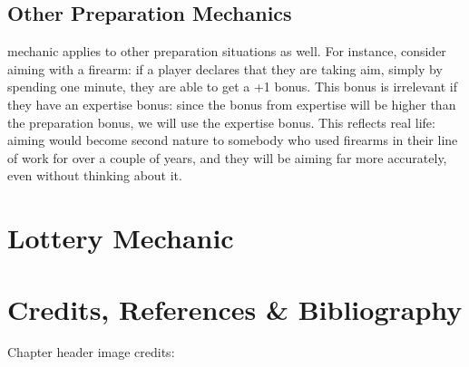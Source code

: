 \subsection{Other Preparation Mechanics}

 mechanic applies to other preparation situations as well.
For instance, consider aiming with a firearm: if a player declares that they are taking aim,
simply by spending one minute, they are able to get a +1 bonus.
This bonus is irrelevant if they have an expertise bonus: since the bonus from expertise
will be higher than the preparation bonus, we will use the expertise bonus.
This reflects real life: aiming would become second nature to somebody who used firearms
in their line of work for over a couple of years, and they will be aiming far more accurately,
even without thinking about it.

\section{Lottery Mechanic}
\label{sec:lottery_mechanic}




\section*{Credits, References \& Bibliography}

Chapter header image credits: \cite{dice_image}

\printbibliography[heading=none]
